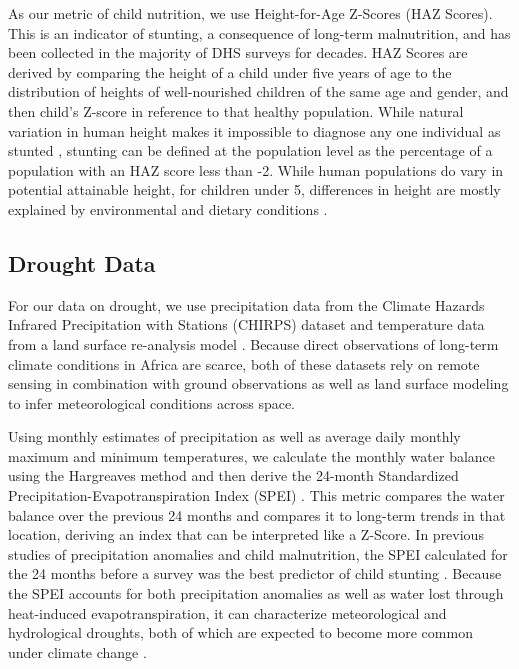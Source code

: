 \documentclass{article}
\begin{document}
As our metric of child nutrition, we use Height-for-Age Z-Scores (HAZ Scores).  This is an indicator of stunting, a consequence of long-term malnutrition, and has been collected in the majority of DHS surveys for decades.  HAZ Scores are derived by comparing the height of a child under five years of age to the distribution of heights of well-nourished children of the same age and gender, and then child's Z-score in reference to that healthy population.  While natural variation in human height makes it impossible to diagnose any one individual as stunted \cite{Perumal2018}, stunting can be defined at the population level as the percentage of a population with an HAZ score less than -2.  While human populations do vary in potential attainable height, for children under 5, differences in height are mostly explained by environmental and dietary conditions \cite{Habicht1974}.

\subsection{Drought Data}
For our data on drought, we use precipitation data from the Climate Hazards Infrared Precipitation with Stations (CHIRPS) dataset \cite{Funk2015} and temperature data from a land surface re-analysis model \cite{Sheffield2006}.  Because direct observations of long-term climate conditions in Africa are scarce, both of these datasets rely on remote sensing in combination with ground observations as well as land surface modeling to infer meteorological conditions across space.

Using monthly estimates of precipitation as well as average daily monthly maximum and minimum temperatures, we calculate the monthly water balance using the Hargreaves method \cite{Hargreaves1982} and then derive the 24-month Standardized Precipitation-Evapotranspiration Index (SPEI) \cite{Begueria2014}.  This metric compares the water balance over the previous 24 months and compares it to long-term trends in that location, deriving an index that can be interpreted like a Z-Score.  In previous studies of precipitation anomalies and child malnutrition, the SPEI calculated for the 24 months before a survey was the best predictor of child stunting \cite{Cooper2019a}.  Because the SPEI accounts for both precipitation anomalies as well as water lost through heat-induced evapotranspiration, it can characterize meteorological and hydrological droughts, both of which are expected to become more common under climate change \cite{Dai2013}.
\end{document}
